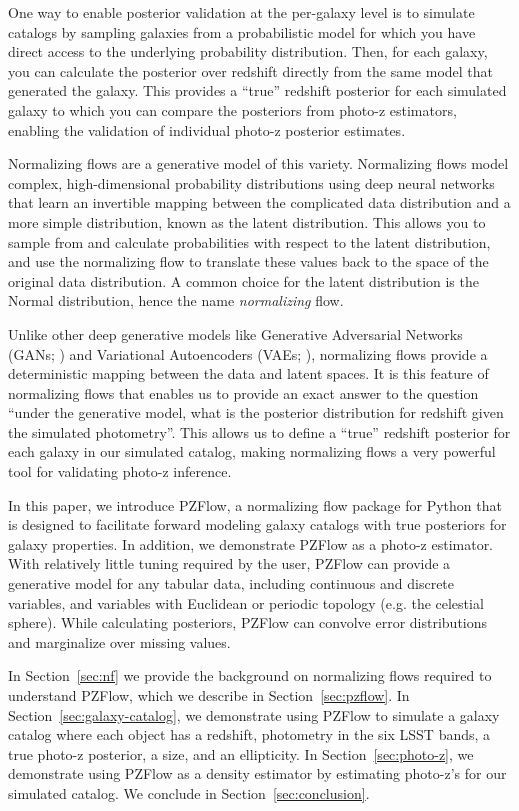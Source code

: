 \documentclass[twocolumn,twocolappendix]{aastex631}
\begin{document}
One way to enable posterior validation at the per-galaxy level is to simulate catalogs by sampling galaxies from a probabilistic model for which you have direct access to the underlying probability distribution.
Then, for each galaxy, you can calculate the posterior over redshift directly from the same model that generated the galaxy.
This provides a ``true'' redshift posterior for each simulated galaxy to which you can compare the posteriors from photo-z estimators, enabling the validation of individual photo-z posterior estimates.

Normalizing flows are a generative model of this variety.
Normalizing flows model complex, high-dimensional probability distributions using deep neural networks that learn an invertible mapping between the complicated data distribution and a more simple distribution, known as the latent distribution.
This allows you to sample from and calculate probabilities with respect to the latent distribution, and use the normalizing flow to translate these values back to the space of the original data distribution.
A common choice for the latent distribution is the Normal distribution, hence the name \emph{normalizing} flow.

Unlike other deep generative models like Generative Adversarial Networks (GANs; \citealt{goodfellow2014}) and Variational Autoencoders (VAEs; \citealt{kingma2014}), normalizing flows provide a deterministic mapping between the data and latent spaces.
It is this feature of normalizing flows that enables us to provide an exact answer to the question ``under the generative model, what is the posterior distribution for redshift given the simulated photometry''.
This allows us to define a ``true'' redshift posterior for each galaxy in our simulated catalog, making normalizing flows a very powerful tool for validating photo-z inference.

In this paper, we introduce PZFlow, a normalizing flow package for Python that is designed to facilitate forward modeling galaxy catalogs with true posteriors for galaxy properties.
In addition, we demonstrate PZFlow as a photo-z estimator.
With relatively little tuning required by the user, PZFlow can provide a generative model for any tabular data, including continuous and discrete variables, and variables with Euclidean or periodic topology (e.g. the celestial sphere).
While calculating posteriors, PZFlow can convolve error distributions and marginalize over missing values.

In Section~\ref{sec:nf} we provide the background on normalizing flows required to understand PZFlow, which we describe in Section~\ref{sec:pzflow}.
In Section~\ref{sec:galaxy-catalog}, we demonstrate using PZFlow to simulate a galaxy catalog where each object has a redshift, photometry in the six LSST bands, a true photo-z posterior, a size, and an ellipticity.
In Section~\ref{sec:photo-z}, we demonstrate using PZFlow as a density estimator by estimating photo-z's for our simulated catalog.
We conclude in Section~\ref{sec:conclusion}.
\end{document}
